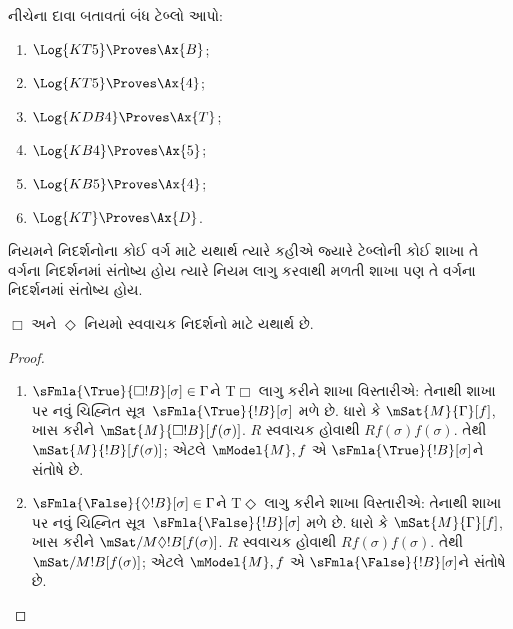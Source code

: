 \begin{prob}
નીચેના દાવા બતાવતાં બંધ ટેબ્લો આપો:
  \begin{enumerate}
  \item $\Log{KT5} \Proves \Ax{B}$;
  \item $\Log{KT5} \Proves \Ax{4}$;
  \item $\Log{KDB4} \Proves \Ax{T}$;
  \item $\Log{KB4} \Proves \Ax{5}$;
  \item $\Log{KB5} \Proves \Ax{4}$;
  \item $\Log{KT} \Proves \Ax{D}$.
  \end{enumerate}
\end{prob}
\endgroup

\begingroup
\makeatletter{}\makeatother

      
\label{guunit:OLP-0466}


નિયમને નિદર્શનોના કોઈ વર્ગ માટે યથાર્થ ત્યારે કહીએ જ્યારે
ટેબ્લોની કોઈ શાખા તે વર્ગના નિદર્શનમાં સંતોષ્ય હોય ત્યારે
નિયમ લાગુ કરવાથી મળતી શાખા પણ તે વર્ગના નિદર્શનમાં સંતોષ્ય હોય.

\begin{prop}
  $\Box$%
   અને %
  $\Diamond$
  નિયમો
  સ્વવાચક નિદર્શનો માટે યથાર્થ છે.
\end{prop}

\begin{proof}
\begin{enumerate}
\item $\sFmla{\True}{\Box !B}[\sigma] \in \Gamma$ને
  T$\Box$ લાગુ કરીને શાખા વિસ્તારીએ:
  તેનાથી શાખા પર નવું ચિહ્નિત સૂત્ર~$\sFmla{\True}{!B}[\sigma]$ મળે છે. ધારો કે
    $\mSat{M}{\Gamma}[f]$, ખાસ કરીને $\mSat{M}{\Box
      !B}[f(\sigma)]$. $R$ સ્વવાચક હોવાથી
    $Rf(\sigma)f(\sigma)$. તેથી $\mSat{M}{!B}[f(\sigma)]$;
    એટલે $\mModel{M}, f$ એ $\sFmla{\True}{!B}[\sigma]$ને
    સંતોષે છે.
\item $\sFmla{\False}{\Diamond !B}[\sigma]
  \in \Gamma$ને T$\Diamond$ લાગુ કરીને શાખા વિસ્તારીએ:
  તેનાથી શાખા પર નવું ચિહ્નિત સૂત્ર~$\sFmla{\False}{!B}[\sigma]$ મળે છે. ધારો કે
    $\mSat{M}{\Gamma}[f]$, ખાસ કરીને $\mSat/{M}{\Diamond
      !B}[f(\sigma)]$. $R$ સ્વવાચક હોવાથી
    $Rf(\sigma)f(\sigma)$. તેથી $\mSat/{M}{!B}[f(\sigma)]$;
    એટલે $\mModel{M}, f$ એ $\sFmla{\False}{!B}[\sigma]$ને
    સંતોષે છે.
\end{enumerate}
\end{proof}



